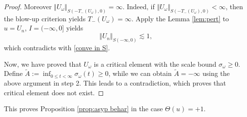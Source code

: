 \documentclass[reqno, 11pt]{amsart}
\numberwithin{equation}{section}
\theoremstyle{plain}
\theoremstyle{definition}
\numberwithin{equation}{section}
\numberwithin{theorem}{section}
\numberwithin{equation}{section}
\numberwithin{equation}{section}
\numberwithin{theorem}{section}
\begin{document}
\begin{proof}
		Moreover $\Vert U_{\omega} \Vert_{S(-T_-(U_{\omega}),0)}=\infty$. Indeed, if $\Vert U_{\omega} \Vert_{S(-T_-(U_{\omega}),0)}<\infty$, then the blow-up criterion yields $T_-(U_{\omega})=\infty$. Apply the Lemma \ref{lem:pert} to $u=U_n$, $I=(-\infty,0]$ yields
		\begin{equation*}
		\Vert U_n \Vert_{S(-\infty,0)} \lesssim1,
		\end{equation*}
		which contradicts with \eqref{conve in S}.
		
		Now, we have proved that $U_{\omega}$ is a critical element with the scale bound $\sigma_{\omega}\geq 0$. Define $\widetilde{A}:=\inf_{0\leq t<\infty}\sigma_{\omega}(t)\geq 0$, while we can obtain $\widetilde{A}=-\infty$ using the above argument in step 2. This leads to a contradiction, which proves that critical element does not exist.
	\end{proof}
	This proves Proposition \ref{prop:asyp behar} in the case $\Theta(u)=+1$.
	
	
	
	
\end{document}
